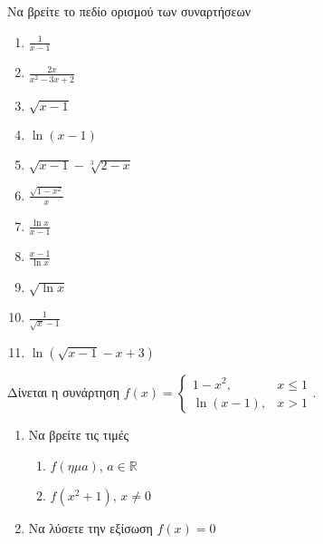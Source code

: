 \documentclass{presentation}
\begin{document}
\begin{askisi}
      Να βρείτε το πεδίο ορισμού των συναρτήσεων
      \begin{enumerate}
            \item<1-> $\frac{1}{x-1}$
            \item<2-> $\frac{2x}{x^2-3x+2}$
            \item<3-> $\sqrt{x-1}$
            \item<4-> $\ln (x-1)$
            \item<5-> $\sqrt{x-1}-\sqrt[3]{2-x}$
            \item<6-> $\frac{\sqrt{1-x^2}}{x}$
            \item<7-> $\frac{\ln x}{x-1}$
            \item<8-> $\frac{x-1}{\ln x}$
            \item<9-> $\sqrt{\ln x}$
            \item<10-> $\frac{1}{\sqrt{x}-1}$
            \item<11-> $\ln \left(\sqrt{x-1}-x+3\right)$
      \end{enumerate}
\end{askisi}

\begin{askisi}
      Δίνεται η συνάρτηση $f(x)=\begin{cases}
                  1-x^2,     & x\le 1 \\
                  \ln (x-1), & x>1
            \end{cases}$.
      \begin{enumerate}
            \item<1-> Να βρείτε τις τιμές
                  \begin{enumerate}
                        \item<1-> $f(ημ a)$, $a\in\mathbb{R}$
                        \item<2-> $f(x^2+1)$, $x\ne 0$
                  \end{enumerate}
            \item<2-> Να λύσετε την εξίσωση $f(x)=0$
      \end{enumerate}
\end{askisi}
\end{document}
